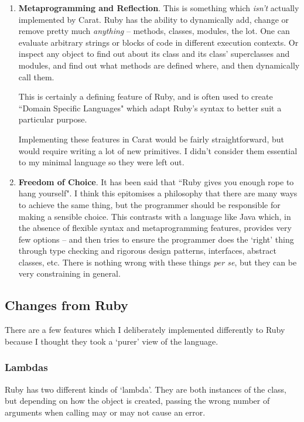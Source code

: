 \begin{enumerate}
  \item \textbf{Metaprogramming and Reflection}. This is something which \emph{isn't} actually implemented by Carat. Ruby has the ability to dynamically add, change or remove pretty much \emph{anything} -- methods, classes, modules, the lot. One can evaluate arbitrary strings or blocks of code in different execution contexts. Or inspect any object to find out about its class and its class' superclasses and modules, and find out what methods are defined where, and then dynamically call them.
  
  This is certainly a defining feature of Ruby, and is often used to create ``Domain Specific Languages" which adapt Ruby's syntax to better suit a particular purpose.
  
  Implementing these features in Carat would be fairly straightforward, but would require writing a lot of new primitives. I didn't consider them essential to my minimal language so they were left out.
  
  \item \textbf{Freedom of Choice}. It has been said that ``Ruby gives you enough rope to hang yourself". I think this epitomises a philosophy that there are many ways to achieve the same thing, but the programmer should be responsible for making a sensible choice. This contrasts with a language like Java which, in the absence of flexible syntax and metaprogramming features, provides very few options -- and then tries to ensure the programmer does the `right' thing through type checking and rigorous design patterns, interfaces, abstract classes, etc. There is nothing wrong with these things \emph{per se}, but they can be very constraining in general.
\end{enumerate}

\subsection{Changes from Ruby}
\label{sec:ruby_comparison}

There are a few features which I deliberately implemented differently to Ruby because I thought they took a `purer' view of the language.

\subsubsection{Lambdas}

Ruby has two different kinds of `lambda'. They are both instances of the  class, but depending on how the object is created, passing the wrong number of arguments when calling may or may not cause an error.

